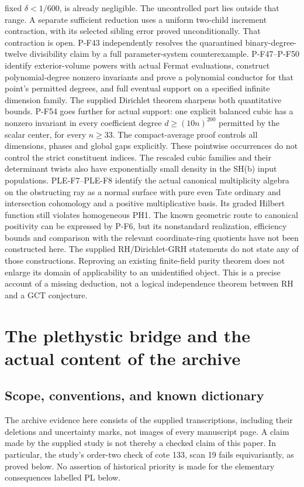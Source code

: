 \documentclass[11pt,a4paper]{article}
\begin{document}
fixed $\delta<1/600$, is already negligible. The uncontrolled
part lies outside that range. A separate sufficient reduction
uses a uniform two-child increment contraction, with its selected
sibling error proved unconditionally. That contraction is open.
P-F43 independently resolves the quarantined binary-degree-twelve
divisibility claim by a full parameter-system counterexample.
P-F47--P-F50 identify exterior-volume powers with actual Fermat
evaluations, construct polynomial-degree nonzero invariants and
prove a polynomial conductor for that point's permitted degrees,
and full eventual support on a specified infinite dimension family.
The supplied Dirichlet theorem sharpens both quantitative bounds.
P-F54 goes further for actual support: one explicit balanced
cubic has a nonzero invariant in every coefficient degree
$d\ge(10n)^{200}$ permitted by the scalar center, for every
$n\ge33$. The compact-average proof controls all dimensions,
phases and global gaps explicitly.
These pointwise occurrences do not control the strict constituent
indices. The rescaled cubic families and their determinant twists
also have exponentially small density in the SH(b) input populations.
PLE-F7--PLE-F8 identify the actual canonical multiplicity algebra on
the obstructing ray as a normal surface with pure even Tate ordinary
and intersection cohomology and a positive multiplicative basis.
Its graded Hilbert function still violates homogeneous PH1.
The known geometric route to
canonical positivity can be expressed by P-F6, but its nonstandard
realization, efficiency bounds and comparison with the relevant
coordinate-ring quotients have not been constructed here.
The supplied RH/Dirichlet-GRH statements do not state any of those
constructions. Reproving an existing finite-field purity theorem does
not enlarge its domain of applicability to an unidentified object.
This is a precise account of a missing deduction, not a logical
independence theorem between RH and a GCT conjecture.


\section{The plethystic bridge and the actual content of the archive}
\label{sec:plethysm-bridge}

\subsection{Scope, conventions, and known dictionary}
The archive evidence here consists of the supplied transcriptions, including their
deletions and uncertainty marks, not images of every manuscript page. A claim made
by the supplied study is not thereby a checked claim of this paper. In particular,
the study's order-two check of cote 133, scan 19 fails equivariantly, as proved
below. No assertion of historical priority is made for the elementary consequences
labelled PL below.
\end{document}
